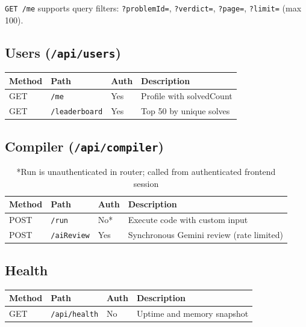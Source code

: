 \documentclass[11pt,a4paper]{article}
\begin{document}
\texttt{GET /me} supports query filters: \texttt{?problemId=}, \texttt{?verdict=}, \texttt{?page=}, \texttt{?limit=} (max 100).

\subsection{Users (\texttt{/api/users})}
\begin{table}[h]
\centering
\small
\begin{tabular}{@{}lllp{4.5cm}@{}}
\toprule
\textbf{Method} & \textbf{Path} & \textbf{Auth} & \textbf{Description} \\
\midrule
GET & \texttt{/me}          & Yes & Profile with solvedCount \\
GET & \texttt{/leaderboard} & Yes & Top 50 by unique solves \\
\bottomrule
\end{tabular}
\end{table}

\subsection{Compiler (\texttt{/api/compiler})}
\begin{table}[h]
\centering
\small
\begin{tabular}{@{}lllp{4.8cm}@{}}
\toprule
\textbf{Method} & \textbf{Path} & \textbf{Auth} & \textbf{Description} \\
\midrule
POST & \texttt{/run}      & No* & Execute code with custom input \\
POST & \texttt{/aiReview} & Yes & Synchronous Gemini review (rate limited) \\
\bottomrule
\end{tabular}
\caption{*Run is unauthenticated in router; called from authenticated frontend session}
\end{table}

\subsection{Health}
\begin{table}[h]
\centering
\small
\begin{tabular}{@{}lllp{5cm}@{}}
\toprule
\textbf{Method} & \textbf{Path} & \textbf{Auth} & \textbf{Description} \\
\midrule
GET & \texttt{/api/health} & No & Uptime and memory snapshot \\
\bottomrule
\end{tabular}
\end{table}
\end{document}
